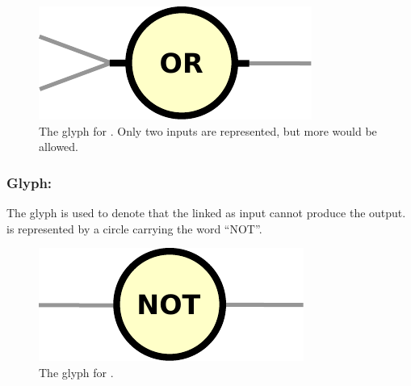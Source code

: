 \begin{figure}[H]
  \centering
  \includegraphics[scale = 0.5]{le_images/or}
  \caption{The \PD glyph for . Only two inputs are represented, but more would be allowed.}
  \label{fig:or}
\end{figure}


\subsubsection{Glyph: }\label{sec:not}

The glyph  is used to denote that the  linked as input cannot produce the output.  is represented by a circle carrying the word ``NOT''.

\begin{figure}[H]
  \centering
  \includegraphics[scale = 0.5]{le_images/not}
  \caption{The \PD glyph for .}
  \label{fig:not}
\end{figure}



%

